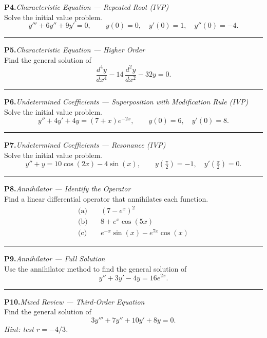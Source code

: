 \documentclass[10pt]{article}
\newcommand{\m}[1]{$#1$}
\newcommand{\annotspace}[1][3.5cm]{\vspace{#1}}
\begin{document}
\noindent\textbf{P4.}\quad\textit{Characteristic Equation --- Repeated Root (IVP)}\\
Solve the initial value problem.
\[
    y''' + 6y'' + 9y' = 0, \qquad y(0) = 0,\quad y'(0) = 1,\quad y''(0) = -4.
\]
\annotspace[6cm]

\hrule\medskip

\noindent\textbf{P5.}\quad\textit{Characteristic Equation --- Higher Order}\\
Find the general solution of
\[
    \frac{d^4y}{dx^4} - 14\,\frac{d^2y}{dx^2} - 32y = 0.
\]
\annotspace[5.5cm]

\hrule\medskip

\noindent\textbf{P6.}\quad\textit{Undetermined Coefficients --- Superposition with Modification Rule (IVP)}\\
Solve the initial value problem.
\[
    y'' + 4y' + 4y = (7 + x)e^{-2x}, \qquad y(0) = 6,\quad y'(0) = 8.
\]
\annotspace[6cm]

\hrule\medskip

\noindent\textbf{P7.}\quad\textit{Undetermined Coefficients --- Resonance (IVP)}\\
Solve the initial value problem.
\[
    y'' + y = 10\cos(2x) - 4\sin(x), \qquad
    y\!\left(\tfrac{\pi}{2}\right) = -1,\quad y'\!\left(\tfrac{\pi}{2}\right) = 0.
\]
\annotspace[6cm]

\hrule\medskip

\noindent\textbf{P8.}\quad\textit{Annihilator --- Identify the Operator}\\
Find a linear differential operator that annihilates each function.
\begin{align*}
    \text{(a)}\quad &(7 - e^x)^2 \\[4pt]
    \text{(b)}\quad &8 + e^x\cos(5x) \\[4pt]
    \text{(c)}\quad &e^{-x}\sin(x) - e^{7x}\cos(x)
\end{align*}
\annotspace[5.5cm]

\hrule\medskip

\noindent\textbf{P9.}\quad\textit{Annihilator --- Full Solution}\\
Use the annihilator method to find the general solution of
\[
    y'' + 3y' - 4y = 16e^{2x}.
\]
\annotspace[6cm]

\hrule\medskip

\noindent\textbf{P10.}\quad\textit{Mixed Review --- Third-Order Equation}\\
Find the general solution of
\[
    3y''' + 7y'' + 10y' + 8y = 0.
\]
\textit{Hint: test \m{r = -4/3}.}
\annotspace[8cm]
\end{document}
